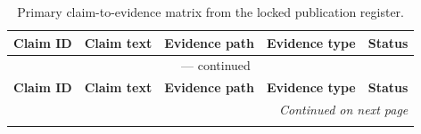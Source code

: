 \begin{scriptsize}
\setlength{\tabcolsep}{2pt}
\begin{longtable}{@{}p{3.5cm}p{3.2cm}p{3.7cm}p{1.8cm}p{1.2cm}@{}}
\caption{Primary claim-to-evidence matrix from the locked publication
register.}
\label{tab:claim-evidence-matrix} \\
\toprule
\textbf{Claim ID} & \textbf{Claim text} & \textbf{Evidence path} &
\textbf{Evidence type} & \textbf{Status} \\
\midrule
\endfirsthead

\multicolumn{5}{c}{\tablename\ \thetable{} --- continued} \\
\toprule
\textbf{Claim ID} & \textbf{Claim text} & \textbf{Evidence path} &
\textbf{Evidence type} & \textbf{Status} \\
\midrule
\endhead

\midrule
\multicolumn{5}{r}{\textit{Continued on next page}} \\
\endfoot

\bottomrule
\endlastfoot


\end{longtable}
\end{scriptsize}
